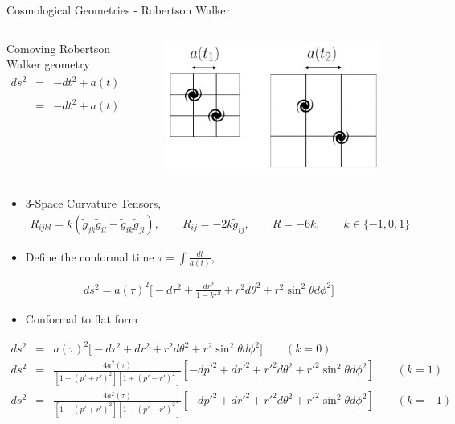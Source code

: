 \documentclass[8pt,aspectratio=1610]{beamer}
\begin{document}
\begin{frame}{Cosmological Geometries - Robertson Walker}
	\begin{columns}
		\begin{column}{0.6\linewidth}
			Comoving Robertson Walker geometry
				\begin{eqnarray}
				ds^2 &=& -dt^2 + a(t)^2 \tilde g_{ij}dx^i dx^j
				\nonumber\\
				&=& -dt^2 + a(t)^2\bigg[\frac{dr^2}{1-kr^2} + r^2 d\theta^2 + r^2 \sin^2\theta d\phi^2\bigg]
				\end{eqnarray}
		\end{column}
		\begin{column}{0.4\linewidth}
		\begin{figure}
			\includegraphics[width=0.8\linewidth]{comoving4.png}
		\end{figure}
		\end{column}
	\end{columns}
	\begin{itemize}
		\item 3-Space Curvature Tensors,
		\begin{eqnarray}
		R_{ijkl} = k(\tilde g_{jk}\tilde g_{il} - \tilde g_{ik}\tilde g_{jl}), \qquad R_{ij} = -2k\tilde g_{ij}, \qquad R = -6k,\qquad k \in \{-1,0,1\}
		\end{eqnarray}
		\item Define the conformal time $\tau = \int \frac{dt}{a(t)}$,
	\end{itemize}
	\begin{eqnarray}
	ds^2 = a(\tau)^2\bigg[-d\tau^2 + \frac{dr^2}{1-kr^2} + r^2 d\theta^2 + r^2 \sin^2\theta d\phi^2\bigg]
	\end{eqnarray}
	\vspace{-3mm}
	\begin{itemize}
		\item Conformal to flat form
	\end{itemize}
	\begin{eqnarray}
		ds^2 &=& a(\tau)^2\big[-d\tau^2 + dr^2 + r^2 d\theta^2 + r^2 \sin^2\theta d\phi^2\big]\qquad (k=0)
		\\
		ds^2 &=& \frac{4a^2(\tau)}{[1+(p'+r')^2][1+(p'-r')^2]}[-dp'^2 + dr'^2 +r'^2 d\theta^2 + r'^2\sin^2\theta d\phi^2]\qquad (k=1)
		\\
		ds^2 &=& \frac{4a^2(\tau)}{[1-(p'+r')^2][1-(p'-r')^2]}[-dp'^2 + dr'^2 +r'^2 d\theta^2 + r'^2\sin^2\theta d\phi^2]\qquad (k=-1)
	\end{eqnarray}		
\end{frame}
\end{document}
